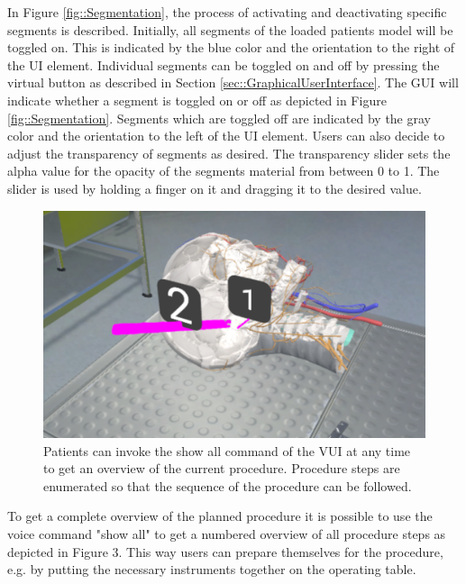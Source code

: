 In Figure \ref{fig::Segmentation}, the process of activating and deactivating specific segments is described.
Initially, all segments of the loaded patients model will be toggled on.
This is indicated by the blue color and the orientation to the right of the UI element.
Individual segments can be toggled on and off by pressing the virtual button as described in Section \ref{sec::GraphicalUserInterface}.
The GUI will indicate whether a segment is toggled on or off as depicted in Figure \ref{fig::Segmentation}.
Segments which are toggled off are indicated by the gray color and the orientation to the left of the UI element.
Users can also decide to adjust the transparency of segments as desired.
The transparency slider sets the alpha value for the opacity of the segments material from between 0 to 1.
The slider is used by holding a finger on it and dragging it to the desired value.

\begin{figure}[ht]
  \centering
  \includegraphics[width=\linewidth]{images/implementation/features/visualization/show_all.png}
  \caption{\label{fig::ShowAll}Patients can invoke the show all command of the VUI at any time to get an overview of the current procedure. Procedure steps are enumerated so that the sequence of the procedure can be followed.}
\end{figure}

To get a complete overview of the planned procedure it is possible to use the voice command "show all" to get a numbered overview of all procedure steps as depicted in Figure 3. 
This way users can prepare themselves for the procedure, e.g. by putting the necessary instruments together on the operating table.

